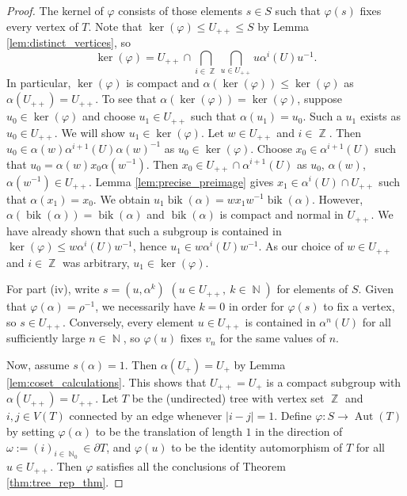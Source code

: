 \documentclass{article}
\DeclareMathOperator\Aut{Aut}
\DeclareMathOperator\bik{bik}
\DeclareMathOperator\bbN{\mathbb{N}}
\DeclareMathOperator\bbZ{\mathbb{Z}}
\theoremstyle{definition}
\begin{document}
\begin{proof}
The kernel of $\varphi$ consists of those elements $s\in S$ such that $\varphi(s)$ fixes every vertex of $T$. Note that $\ker(\varphi)\le U_{++}\le S$ by Lemma \ref{lem:distinct_vertices}, so
\begin{displaymath}
  \ker(\varphi)=U_{++}\cap\bigcap_{i\in\bbZ}\bigcap_{u\in U_{++}}u\alpha^{i}(U)u^{-1}.
\end{displaymath}
In particular, $\ker(\varphi)$ is compact and $\alpha(\ker(\varphi))\le\ker(\varphi)$ as $\alpha(U_{++})=U_{++}$. To see that $\alpha(\ker(\varphi)) = \ker(\varphi)$, suppose $u_0\in\ker(\varphi)$ and choose $u_1\in U_{++}$ such that $\alpha(u_1) = u_0$. Such a $u_1$ exists as $u_0\in U_{++}$. We will show $u_1\in \ker(\varphi)$. Let $w\in U_{++}$ and $i\in\bbZ$. Then $u_0\in \alpha(w)\alpha^{i+1}(U)\alpha(w)^{-1}$ as $u_0\in\ker(\varphi)$. Choose $x_{0}\in\alpha^{i+1}(U)$ such that $u_0 = \alpha(w)x_{0}\alpha(w^{-1})$. Then $x_{0}\in U_{++}\cap\alpha^{i+1}(U)$ as $u_{0}$, $\alpha(w)$, $\alpha(w^{-1})\in U_{++}$. Lemma \ref{lem:precise_preimage} gives $x_{1}\in\alpha^{i}(U)\cap U_{++}$ such that $\alpha(x_{1})=x_{0}$. We obtain $u_1\bik(\alpha) = wx_{1}w^{-1}\bik(\alpha)$. However, $\alpha(\bik(\alpha)) = \bik(\alpha)$ and $\bik(\alpha)$ is compact and normal in $U_{++}$. We have already shown that such a subgroup is contained in $\ker(\varphi)\le w\alpha^{i}(U)w^{-1}$, hence $u_1\in w\alpha^{i}(U)w^{-1}$. As our choice of $w\in U_{++}$ and $i\in\bbZ$ was arbitrary, $u_1\in\ker(\varphi)$.

For part (iv), write $s=(u,\alpha^{k})$ $(u\in U_{++},\ k\in\bbN)$ for elements of $S$. Given that $\varphi(\alpha)=\rho^{-1}$, we necessarily have $k=0$ in order for $\varphi(s)$ to fix a vertex, so $s\in U_{++}$. Conversely, every element $u\in U_{++}$ is contained in $\alpha^{n}(U)$ for all sufficiently large $n\in\bbN$, so $\varphi(u)$ fixes $v_{n}$ for the same values of $n$.

Now, assume $s(\alpha) = 1$. Then $\alpha(U_+) = U_+$ by Lemma \ref{lem:coset_calculations}. This shows that $U_{++} = U_{+}$ is a compact subgroup with $\alpha(U_{++}) = U_{++}$. Let $T$ be the (undirected) tree with vertex set $\bbZ$ and $i,j\in V(T)$ connected by an edge whenever $|i-j|=1$. Define $\varphi:S\to\Aut(T)$ by setting $\varphi(\alpha)$ to be the translation of length $1$ in the direction of $\omega:=(i)_{i\in\bbN_{0}}\in\partial T$, and $\varphi(u)$ to be the identity automorphism of $T$ for all $u\in U_{++}$. Then $\varphi$ satisfies all the conclusions of Theorem \ref{thm:tree_rep_thm}. 
\end{proof}
\end{document}
